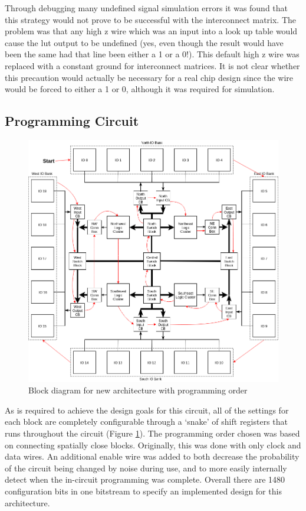 \documentclass[12pt]{article}
\begin{document}
Through debugging many undefined signal simulation errors it was found that this strategy
would not prove to be successful with the interconnect matrix. The problem was that any high z
wire which was an input into a look up table would cause the lut output to be undefined (yes,
even though the result would have been the same had that line been either a 1 or a 0!).
This default high z wire was replaced with a constant ground for interconnect matrices.
It is not clear whether this precaution would actually be necessary for a real chip design
since the wire would be forced to either a 1 or 0, although it was required for simulation.

\subsection{Programming Circuit}

\begin{figure}[htb]
  \centering
  \includegraphics[width=.6\textwidth]{prog_diag}
  \caption{Block diagram for new architecture with programming order}
  \label{fig:prog_diag}
\end{figure}

As is required to achieve the design goals for this circuit, all of the settings for
each block are completely configurable through a ‘snake’ of shift registers that runs throughout 
the circuit (Figure \ref{fig:prog_diag}). The programming order chosen was based on connecting
spatially close blocks. Originally, this was done with only clock and data
wires. An additional enable wire was added to both decrease the probability of the circuit
being changed by noise during use, and to more easily internally detect when the
in-circuit programming was complete. Overall there are 1480 configuration bits in one 
bitstream to specify an implemented design for this architecture.
\end{document}
